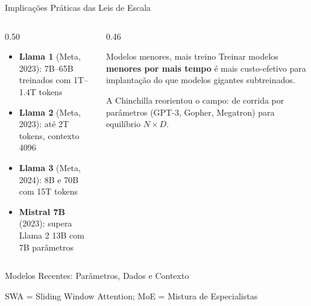 \documentclass[aspectratio=169, xcolor=dvipsnames]{beamer}
\begin{document}
  \begin{frame}{Implicações Práticas das Leis de Escala}
    \begin{columns}[T]
      \begin{column}{0.50\textwidth}
        \begin{itemize}
          \item \textbf{Llama 1} (Meta, 2023): 7B--65B treinados com 1T--1.4T tokens
          \item \textbf{Llama 2} (Meta, 2023): até 2T tokens, contexto 4096
          \item \textbf{Llama 3} (Meta, 2024): 8B e 70B com 15T tokens
          \item \textbf{Mistral 7B} (2023): supera Llama 2 13B com 7B parâmetros
        \end{itemize}
      \end{column}
      \begin{column}{0.46\textwidth}
        \begin{exampleblock}{Modelos menores, mais treino}
          Treinar modelos \textbf{menores por mais tempo} é mais custo-efetivo para implantação do que modelos gigantes subtreinados.
        \end{exampleblock}
        \vspace{0.3em}
        A Chinchilla reorientou o campo: de corrida por parâmetros (GPT-3, Gopher, Megatron) para equilíbrio $N \times D$.
      \end{column}
    \end{columns}
  \end{frame}

  \begin{frame}{Modelos Recentes: Parâmetros, Dados e Contexto}
    \vspace{0.3em}
    \begin{center}
      \footnotesize SWA = Sliding Window Attention; MoE = Mistura de Especialistas
    \end{center}
  \end{frame}
\end{document}
